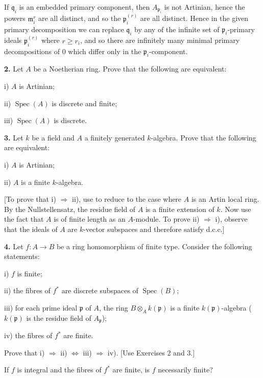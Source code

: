 If \(\mathfrak q_i\) is an embedded primary component, then \(A_{\mathfrak p_i}\) is not Artinian, hence the powers \(\mathfrak m_i^r\) are all distinct, and so the \(\mathfrak p_i^{(r)}\) are all distinct. Hence in the given primary decomposition we can replace \(\mathfrak q_i\) by any of the infinite set of \(\mathfrak p_i\)-primary ideals \(\mathfrak p_i^{(r)}\) where \(r\geq r_i\), and so there are infinitely many minimal primary decompositions of 0 which differ only in the \(\mathfrak p_i\)-component.

\noindent\textbf{2.} Let \(A\) be a Noetherian ring. Prove that the following are equivalent:

i) \(A\) is Artinian;

ii) \(\operatorname{Spec}(A)\) is discrete and finite;

iii) \(\operatorname{Spec}(A)\) is discrete.

\noindent\amstar\textbf{3.} Let \(k\) be a field and \(A\) a finitely generated \(k\)-algebra. Prove that the following are equivalent:

i) \(A\) is Artinian;

ii) \(A\) is a finite \(k\)-algebra.

[To prove that i) \(\Rightarrow\) ii), use  to reduce to the case where \(A\) is an Artin local ring. By the Nullstellensatz, the residue field of \(A\) is a finite extension of \(k\). Now use the fact that \(A\) is of finite length as an \(A\)-module. To prove ii) \(\Rightarrow\) i), observe that the ideals of \(A\) are \(k\)-vector subspaces and therefore satisfy d.c.c.]

\noindent\amstar\textbf{4.} Let \(f:A\to B\) be a ring homomorphism of finite type. Consider the following statements:

i) \(f\) is finite;

ii) the fibres of \(f^*\) are discrete subspaces of \(\operatorname{Spec}(B)\);

iii) for each prime ideal \(\mathfrak p\) of \(A\), the ring \(B\otimes_A k(\mathfrak p)\) is a finite \(k(\mathfrak p)\)-algebra (\(k(\mathfrak p)\) is the residue field of \(A_\mathfrak p\));

iv) the fibres of \(f^*\) are finite.

Prove that i) \(\Rightarrow\) ii) \(\Longleftrightarrow\) iii) \(\Rightarrow\) iv). [Use Exercises 2 and 3.]

If \(f\) is integral and the fibres of \(f^*\) are finite, is \(f\) necessarily finite?

